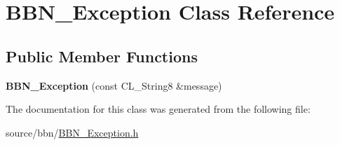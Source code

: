 \hypertarget{classBBN__Exception}{
\section{BBN\_\-Exception Class Reference}
\label{classBBN__Exception}
}
\subsection*{Public Member Functions}
\begin{DoxyCompactItemize}
\item 
\hypertarget{classBBN__Exception_a6e718a70c69a38fc2b587e24891c970b}{
{\bfseries BBN\_\-Exception} (const CL\_\-String8 \&message)}
\label{classBBN__Exception_a6e718a70c69a38fc2b587e24891c970b}

\end{DoxyCompactItemize}


The documentation for this class was generated from the following file:\begin{DoxyCompactItemize}
\item 
source/bbn/\hyperlink{BBN__Exception_8h}{BBN\_\-Exception.h}\end{DoxyCompactItemize}
